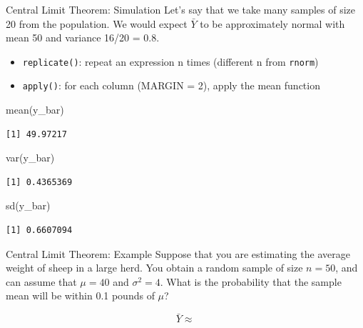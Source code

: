 \documentclass[
  ignorenonframetext,
]{beamer}
\newenvironment{Shaded}{\begin{snugshade}}{\end{snugshade}}
\newcommand{\FunctionTok}[1]{\textcolor[rgb]{0.28,0.35,0.67}{#1}}
\newcommand{\NormalTok}[1]{\textcolor[rgb]{0.00,0.23,0.31}{#1}}
\providecommand{\tightlist}{%
  \setlength{\itemsep}{0pt}\setlength{\parskip}{0pt}}
\begin{document}
\begin{frame}[fragile]{Central Limit Theorem: Simulation}
\protect{}\label{central-limit-theorem-simulation-2}
Let's say that we take many samples of size 20 from the population. We
would expect \(\bar{Y}\) to be approximately normal with mean 50 and
variance 16/20 = 0.8.

\begin{itemize}
\tightlist
\item
  \texttt{replicate()}: repeat an expression n times (different n from
  \texttt{rnorm})
\item
  \texttt{apply()}: for each column (MARGIN = 2), apply the mean
  function
\end{itemize}

\begin{Shaded}
\begin{Highlighting}[]
\FunctionTok{mean}\NormalTok{(y\_bar)}
\end{Highlighting}
\end{Shaded}

\begin{verbatim}
[1] 49.97217
\end{verbatim}

\begin{Shaded}
\begin{Highlighting}[]
\FunctionTok{var}\NormalTok{(y\_bar)}
\end{Highlighting}
\end{Shaded}

\begin{verbatim}
[1] 0.4365369
\end{verbatim}

\begin{Shaded}
\begin{Highlighting}[]
\FunctionTok{sd}\NormalTok{(y\_bar)}
\end{Highlighting}
\end{Shaded}

\begin{verbatim}
[1] 0.6607094
\end{verbatim}
\end{frame}

\begin{frame}{Central Limit Theorem: Example}
\protect{}\label{central-limit-theorem-example}
Suppose that you are estimating the average weight of sheep in a large
herd. You obtain a random sample of size \(n=50\), and can assume that
\(\mu=40\) and \(\sigma^2=4\). What is the probability that the sample
mean will be within 0.1 pounds of \(\mu\)?

\[
\bar{Y}\approx 
\]
\end{frame}
\end{document}
